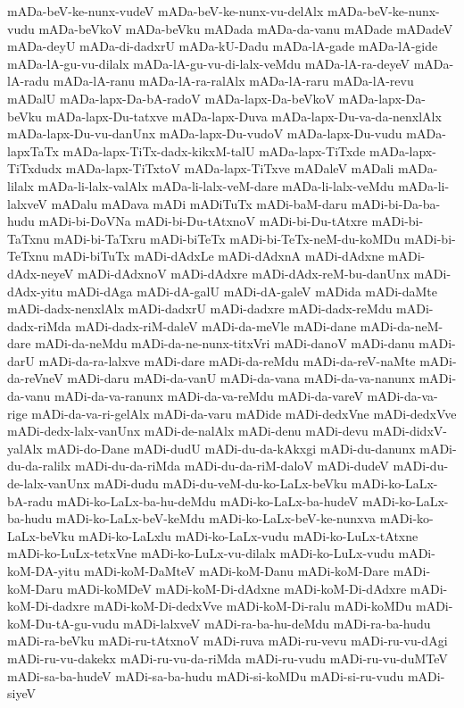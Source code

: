 {mADa-beV-ke-nunx-vudeV
mADa-beV-ke-nunx-vu-delAlx
mADa-beV-ke-nunx-vudu
mADa-beVkoV
mADa-beVku
mADada
mADa-da-vanu
mADade
mADadeV
mADa-deyU
mADa-di-dadxrU
mADa-kU-Dadu
mADa-lA-gade
mADa-lA-gide
mADa-lA-gu-vu-dilalx
mADa-lA-gu-vu-di-lalx-veMdu
mADa-lA-ra-deyeV
mADa-lA-radu
mADa-lA-ranu
mADa-lA-ra-ralAlx
mADa-lA-raru
mADa-lA-revu
mADalU
mADa-lapx-Da-bA-radoV
mADa-lapx-Da-beVkoV
mADa-lapx-Da-beVku
mADa-lapx-Du-tatxve
mADa-lapx-Duva
mADa-lapx-Du-va-da-nenxlAlx
mADa-lapx-Du-vu-danUnx
mADa-lapx-Du-vudoV
mADa-lapx-Du-vudu
mADa-lapxTaTx
mADa-lapx-TiTx-dadx-kikxM-talU
mADa-lapx-TiTxde
mADa-lapx-TiTxdudx
mADa-lapx-TiTxtoV
mADa-lapx-TiTxve
mADaleV
mADali
mADa-lilalx
mADa-li-lalx-valAlx
mADa-li-lalx-veM-dare
mADa-li-lalx-veMdu
mADa-li-lalxveV
mADalu
mADava
mADi
mADiTuTx
mADi-baM-daru
mADi-bi-Da-ba-hudu
mADi-bi-DoVNa
mADi-bi-Du-tAtxnoV
mADi-bi-Du-tAtxre
mADi-bi-TaTxnu
mADi-bi-TaTxru
mADi-biTeTx
mADi-bi-TeTx-neM-du-koMDu
mADi-bi-TeTxnu
mADi-biTuTx
mADi-dAdxLe
mADi-dAdxnA
mADi-dAdxne
mADi-dAdx-neyeV
mADi-dAdxnoV
mADi-dAdxre
mADi-dAdx-reM-bu-danUnx
mADi-dAdx-yitu
mADi-dAga
mADi-dA-galU
mADi-dA-galeV
mADida
mADi-daMte
mADi-dadx-nenxlAlx
mADi-dadxrU
mADi-dadxre
mADi-dadx-reMdu
mADi-dadx-riMda
mADi-dadx-riM-daleV
mADi-da-meVle
mADi-dane
mADi-da-neM-dare
mADi-da-neMdu
mADi-da-ne-nunx-titxVri
mADi-danoV
mADi-danu
mADi-darU
mADi-da-ra-lalxve
mADi-dare
mADi-da-reMdu
mADi-da-reV-naMte
mADi-da-reVneV
mADi-daru
mADi-da-vanU
mADi-da-vana
mADi-da-va-nanunx
mADi-da-vanu
mADi-da-va-ranunx
mADi-da-va-reMdu
mADi-da-vareV
mADi-da-va-rige
mADi-da-va-ri-gelAlx
mADi-da-varu
mADide
mADi-dedxVne
mADi-dedxVve
mADi-dedx-lalx-vanUnx
mADi-de-nalAlx
mADi-denu
mADi-devu
mADi-didxV-yalAlx
mADi-do-Dane
mADi-dudU
mADi-du-da-kAkxgi
mADi-du-danunx
mADi-du-da-ralilx
mADi-du-da-riMda
mADi-du-da-riM-daloV
mADi-dudeV
mADi-du-de-lalx-vanUnx
mADi-dudu
mADi-du-veM-du-ko-LaLx-beVku
mADi-ko-LaLx-bA-radu
mADi-ko-LaLx-ba-hu-deMdu
mADi-ko-LaLx-ba-hudeV
mADi-ko-LaLx-ba-hudu
mADi-ko-LaLx-beV-keMdu
mADi-ko-LaLx-beV-ke-nunxva
mADi-ko-LaLx-beVku
mADi-ko-LaLxlu
mADi-ko-LaLx-vudu
mADi-ko-LuLx-tAtxne
mADi-ko-LuLx-tetxVne
mADi-ko-LuLx-vu-dilalx
mADi-ko-LuLx-vudu
mADi-koM-DA-yitu
mADi-koM-DaMteV
mADi-koM-Danu
mADi-koM-Dare
mADi-koM-Daru
mADi-koMDeV
mADi-koM-Di-dAdxne
mADi-koM-Di-dAdxre
mADi-koM-Di-dadxre
mADi-koM-Di-dedxVve
mADi-koM-Di-ralu
mADi-koMDu
mADi-koM-Du-tA-gu-vudu
mADi-lalxveV
mADi-ra-ba-hu-deMdu
mADi-ra-ba-hudu
mADi-ra-beVku
mADi-ru-tAtxnoV
mADi-ruva
mADi-ru-vevu
mADi-ru-vu-dAgi
mADi-ru-vu-dakekx
mADi-ru-vu-da-riMda
mADi-ru-vudu
mADi-ru-vu-duMTeV
mADi-sa-ba-hudeV
mADi-sa-ba-hudu
mADi-si-koMDu
mADi-si-ru-vudu
mADi-siyeV
}

